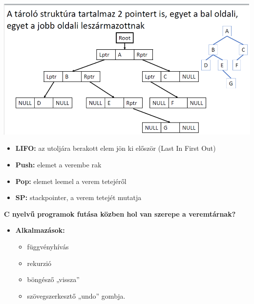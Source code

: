 \documentclass[11pt,a4paper]{article}
\begin{document}
\begin{tcolorbox}[colback=blue!5!white,colframe=blue!50!black,title= 23. Ismertesse a bináris fák szerkezetét és tárolási lehetőségeit számítógépen!]
\begin{center}
                \end{center}
                \begin{center}
                    \includegraphics[scale = 0.3]{23_4.png}
                \end{center}
            \end{tcolorbox}
            
            \begin{tcolorbox}[colback=blue!5!white,colframe=blue!50!black,title= 24. Ismertesse a veremtár működését!]
                \begin{itemize}
                    \item \textbf{LIFO:} az utoljára berakott elem jön ki először (Last In First Out)
                    \item \textbf{Push:} elemet a verembe rak
                    \item \textbf{Pop:} elemet leemel a verem tetejéről
                    \item \textbf{SP:} stackpointer, a verem tetejét mutatja
                \end{itemize}
                \textbf{C nyelvű programok futása közben hol van szerepe a veremtárnak?}
                \begin{itemize}
                    \item \textbf{Alkalmazások:}
                    \begin{itemize}
                        \item függvényhívás
                        \item rekurzió
                        \item böngésző „vissza”
                        \item szövegszerkesztő „undo” gombja.
                    \end{itemize}
                \end{itemize}
            \end{tcolorbox}
            
\end{document}
